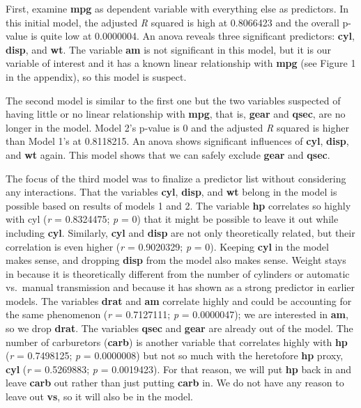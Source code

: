 \documentclass[]{article}
\begin{document}
First, examine \textbf{mpg} as dependent variable with everything else
as predictors. In this initial model, the adjusted \emph{R} squared is
high at 0.8066423 and the overall p-value is quite low at 0.0000004. An
anova reveals three significant predictors: \textbf{cyl}, \textbf{disp},
and \textbf{wt}. The variable \textbf{am} is not significant in this
model, but it is our variable of interest and it has a known linear
relationship with \textbf{mpg} (see Figure 1 in the appendix), so this
model is suspect.

The second model is similar to the first one but the two variables
suspected of having little or no linear relationship with \textbf{mpg},
that is, \textbf{gear} and \textbf{qsec}, are no longer in the model.
Model 2's p-value is 0 and the adjusted \emph{R} squared is higher than
Model 1's at 0.8118215. An anova shows significant influences of
\textbf{cyl}, \textbf{disp}, and \textbf{wt} again. This model shows
that we can safely exclude \textbf{gear} and \textbf{qsec}.

The focus of the third model was to finalize a predictor list without
considering any interactions. That the variables \textbf{cyl},
\textbf{disp}, and \textbf{wt} belong in the model is possible based on
results of models 1 and 2. The variable \textbf{hp} correlates so highly
with cyl (\emph{r} = 0.8324475; \emph{p} = 0) that it might be possible
to leave it out while including \textbf{cyl}. Similarly, \textbf{cyl}
and \textbf{disp} are not only theoretically related, but their
correlation is even higher (\emph{r} = 0.9020329; \emph{p} = 0). Keeping
\textbf{cyl} in the model makes sense, and dropping \textbf{disp} from
the model also makes sense. Weight stays in because it is theoretically
different from the number of cylinders or automatic vs.~manual
transmission and because it has shown as a strong predictor in earlier
models. The variables \textbf{drat} and \textbf{am} correlate highly and
could be accounting for the same phenomenon (\emph{r} = 0.7127111;
\emph{p} = 0.0000047); we are interested in \textbf{am}, so we drop
\textbf{drat}. The variables \textbf{qsec} and \textbf{gear} are already
out of the model. The number of carburetors (\textbf{carb}) is another
variable that correlates highly with \textbf{hp} (\emph{r} = 0.7498125;
\emph{p} = 0.0000008) but not so much with the heretofore \textbf{hp}
proxy, \textbf{cyl} (\emph{r} = 0.5269883; \emph{p} = 0.0019423). For
that reason, we will put \textbf{hp} back in and leave \textbf{carb} out
rather than just putting \textbf{carb} in. We do not have any reason to
leave out \textbf{vs}, so it will also be in the model.
\end{document}
